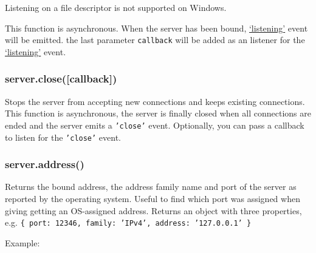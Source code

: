 Listening on a file descriptor is not supported on Windows.

This function is asynchronous. When the server has been bound,
\hyperref[event\_listening\_]{`listening'} event will be emitted. the
last parameter \texttt{callback} will be added as an listener for the
\hyperref[event\_listening\_]{`listening'} event.

\subsubsection{server.close({[}callback{]})}

Stops the server from accepting new connections and keeps existing
connections. This function is asynchronous, the server is finally closed
when all connections are ended and the server emits a \texttt{'close'}
event. Optionally, you can pass a callback to listen for the
\texttt{'close'} event.

\subsubsection{server.address()}

Returns the bound address, the address family name and port of the
server as reported by the operating system. Useful to find which port
was assigned when giving getting an OS-assigned address. Returns an
object with three properties, e.g.
\texttt{\{ port: 12346, family: 'IPv4', address: '127.0.0.1' \}}

Example:

\begin{Shaded}
\end{Shaded}

